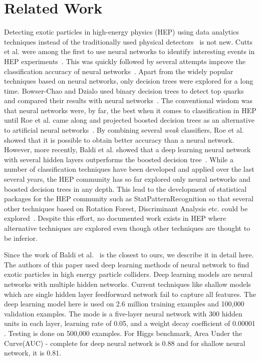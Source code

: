 \section{Related Work}
\label{sec:related}

Detecting exotic particles in high-energy physics (HEP) using data analytics techniques instead of the traditionally used physical detectors~\cite{detectors} is not new. Cutts et al. were among the first to use neural networks to identify interesting events in HEP experiments~\cite{Cutts-NN1}. This was quickly followed by several attempts  improve the classification accuracy of neural networks~\cite{NN2,NN3}. Apart from the widely popular techniques based on neural networks, only decision trees were explored for a long time. Bowser-Chao and Dzialo used binary decision trees to detect top quarks and compared their results with neural networks~\cite{Binary-DT}. The conventional wisdom was that neural networks were, by far, the best when it comes to classification in HEP until Roe et al. came along and projected boosted decision trees as an alternative to artificial neural networks~\cite{Boosted-DT}. By combining several \emph{weak} classifiers, Roe et al. showed that it is possible to obtain better accuracy than a neural network. However, more recently, Baldi et al. showed that a deep learning neural network with several hidden layers outperforms the boosted decision tree~\cite{DeepNN}. While a number of classification techniques have been developed and applied over the last several years, the HEP community has so far explored only neural networks and boosted decision trees in any depth. This lead to the development of statistical packages for the HEP community such as StatPatternRecognition so that several other techniques based on Rotation Forest, Discriminant Analysis etc. could be explored~\cite{StatPatternRecognition}. Despite this effort, no documented work exists in HEP where alternative techniques are explored even though other techniques are thought to be inferior.

Since the work of Baldi et al.~\cite{DeepNN} is the closest to ours, we describe it in detail here. The authors of this paper used deep learning methods of neural network to find exotic particles in high energy particle colliders. Deep learning models are neural networks with multiple hidden networks. Current techniques like shallow models which are single hidden layer feedforward network fail to capture all features.
The deep learning model here is used on 2.6 million training examples and 100,000 validation examples. The mode is a five-layer neural network with 300 hidden units in each layer, learning rate of 0.05, and a weight decay coefficient of 0.00001 . Testing is done on 500,000 examples. For Higgs benchmark, Area Under the Curve(AUC) - complete for deep neural network is 0.88 and for shallow neural network, it is 0.81.

